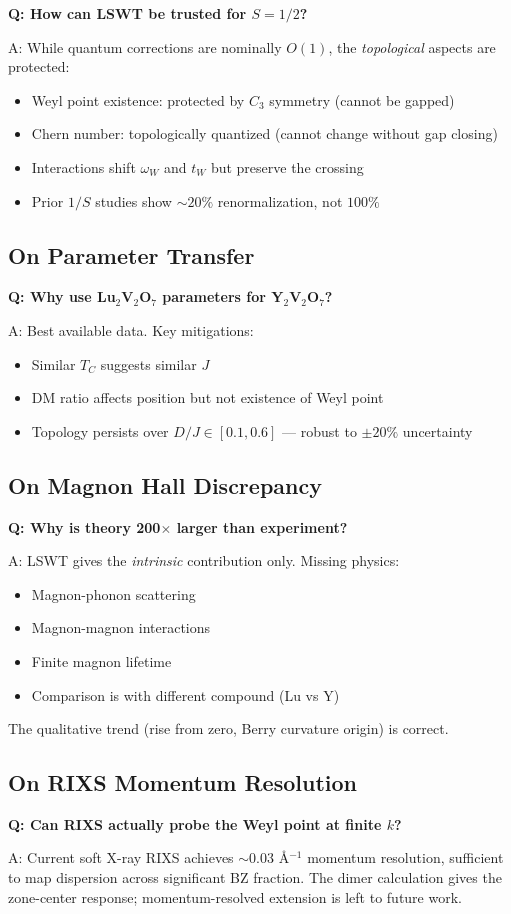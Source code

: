 \documentclass[11pt,letterpaper]{article}
\begin{document}
\textbf{Q: How can LSWT be trusted for $S = 1/2$?}

A: While quantum corrections are nominally $O(1)$, the \emph{topological} aspects are protected:
\begin{itemize}
    \item Weyl point existence: protected by $C_3$ symmetry (cannot be gapped)
    \item Chern number: topologically quantized (cannot change without gap closing)
    \item Interactions shift $\omega_W$ and $t_W$ but preserve the crossing
    \item Prior $1/S$ studies show $\sim 20\%$ renormalization, not $100\%$
\end{itemize}

\subsection{On Parameter Transfer}

\textbf{Q: Why use Lu$_2$V$_2$O$_7$ parameters for Y$_2$V$_2$O$_7$?}

A: Best available data. Key mitigations:
\begin{itemize}
    \item Similar $T_C$ suggests similar $J$
    \item DM ratio affects position but not existence of Weyl point
    \item Topology persists over $D/J \in [0.1, 0.6]$ --- robust to $\pm 20\%$ uncertainty
\end{itemize}

\subsection{On Magnon Hall Discrepancy}

\textbf{Q: Why is theory 200$\times$ larger than experiment?}

A: LSWT gives the \emph{intrinsic} contribution only. Missing physics:
\begin{itemize}
    \item Magnon-phonon scattering
    \item Magnon-magnon interactions
    \item Finite magnon lifetime
    \item Comparison is with different compound (Lu vs Y)
\end{itemize}
The qualitative trend (rise from zero, Berry curvature origin) is correct.

\subsection{On RIXS Momentum Resolution}

\textbf{Q: Can RIXS actually probe the Weyl point at finite $k$?}

A: Current soft X-ray RIXS achieves $\sim 0.03$ \AA$^{-1}$ momentum resolution, sufficient to map dispersion across significant BZ fraction. The dimer calculation gives the zone-center response; momentum-resolved extension is left to future work.
\end{document}

